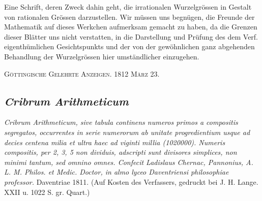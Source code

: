 \documentclass[12pt]{article}
\begin{document}
Eine Schrift, deren Zweck dahin geht, die irrationalen Wurzelgrössen in Gestalt von rationalen Grössen darzustellen. Wir müssen uns begnügen, die Freunde der Mathematik auf dieses Werkchen aufmerksam gemacht zu haben, da die Grenzen dieser Blätter uns nicht verstatten, in die Darstellung und Prüfung des dem Verf. eigenthümlichen Gesichtspunkts und der von der gewöhnlichen ganz abgehenden Behandlung der Wurzelgrössen hier umständlicher einzugehen.

\begin{center}
\textsc{Göttingische Gelehrte Anzeigen. 1812 März 23.}
\end{center}

\subsection*{\textit{Cribrum Arithmeticum}}

\begin{center}
\textit{Cribrum Arithmeticum, sive tabula continens numeros primos a compositis segregatos, occurrentes in serie numerorum ab unitate progredientium usque ad decies centena milia et ultra haec ad viginti millia (1020000). Numeris compositis, per 2, 3, 5 non dividuis, adscripti sunt divisores simplices, non minimi tantum, sed omnino omnes. Confecit Ladislaus Chernac, Pannonius, A. L. M. Philos. et Medic. Doctor, in almo lyceo Daventriensi philosophiae professor.} Daventriae 1811. (Auf Kosten des Verfassers, gedruckt bei J. H. Lange. XXII u. 1022 S. gr. Quart.)
\end{center}
\end{document}
